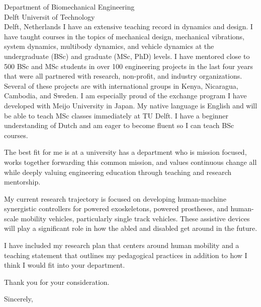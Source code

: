 \documentclass{letter}
\begin{document}
\begin{letter}{
  Department of Biomechanical Engineering \\
  Delft Universit of Technology \\
  Delft, Netherlands
}
I have an extensive teaching record in dynamics and design. I have taught
courses in the topics of mechanical design, mechanical vibrations, system
dynamics, multibody dynamics, and vehicle dynamics at the undergraduate (BSc)
and graduate (MSc, PhD) levels. I have mentored close to 500 BSc and MSc
students in over 100 engineering projects in the last four years that were all
partnered with research, non-profit, and industry organizations. Several of
these projects are with international groups in Kenya, Nicaragua, Cambodia, and
Sweden. I am especially proud of the exchange program I have developed with
Meijo University in Japan. My native language is English and will be able to
teach MSc classes immediately at TU Delft. I have a beginner understanding of
Dutch and am eager to become fluent so I can teach BSc courses.

The best fit for me is at a university has a department who is mission focused,
works together forwarding this common mission, and values continuous change all
while deeply valuing engineering education through teaching and research
mentorship.

My current research trajectory is focused on developing human-machine
synergistic controllers for powered exoskeletons, powered prostheses, and
human-scale mobility vehicles, particularly single track vehicles. These
assistive devices will play a significant role in how the abled and disabled
get around in the future.

I have included my research plan that centers around human mobility and a
teaching statement that outlines my pedagogical practices in addition to how I
think I would fit into your department.

Thank you for your consideration.

\closing{Sincerely,}

\end{letter}
\end{document}
